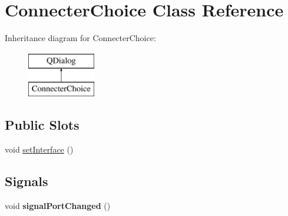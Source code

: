 \hypertarget{class_connecter_choice}{\section{Connecter\-Choice Class Reference}
\label{class_connecter_choice}
}
Inheritance diagram for Connecter\-Choice\-:\begin{figure}[H]
\begin{center}
\leavevmode
\includegraphics[height=2.000000cm]{class_connecter_choice}
\end{center}
\end{figure}
\subsection*{Public Slots}
\begin{DoxyCompactItemize}
\item 
void \hyperlink{class_connecter_choice_ac210d1925ae47463fe2046317d435f49}{set\-Interface} ()
\end{DoxyCompactItemize}
\subsection*{Signals}
\begin{DoxyCompactItemize}
\item 
\hypertarget{class_connecter_choice_a4b5899671696ea0758dde6f15c7668c4}{void {\bfseries signal\-Port\-Changed} ()}\label{class_connecter_choice_a4b5899671696ea0758dde6f15c7668c4}

\end{DoxyCompactItemize}
